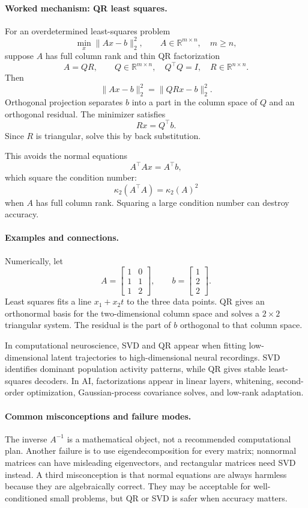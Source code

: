 \paragraph{Worked mechanism: QR least squares.}
For an overdetermined least-squares problem
\[
\min_x \|Ax-b\|_2^2,\qquad A\in\mathbb{R}^{m\times n},\quad m\geq n,
\]
suppose \(A\) has full column rank and thin QR factorization
\[
A=QR,
\qquad
Q\in\mathbb{R}^{m\times n},\quad Q^\top Q=I,\quad R\in\mathbb{R}^{n\times n}.
\]
Then
\[
\|Ax-b\|_2^2=\|QRx-b\|_2^2.
\]
Orthogonal projection separates \(b\) into a part in the column space of \(Q\) and an orthogonal residual. The minimizer satisfies
\[
Rx=Q^\top b.
\]
Since \(R\) is triangular, solve this by back substitution.

This avoids the normal equations
\[
A^\top A x=A^\top b,
\]
which square the condition number:
\[
\kappa_2(A^\top A)=\kappa_2(A)^2
\]
when \(A\) has full column rank. Squaring a large condition number can destroy accuracy.

\paragraph{Examples and connections.}
Numerically, let
\[
A=\begin{bmatrix}1&0\\1&1\\1&2\end{bmatrix},\qquad b=\begin{bmatrix}1\\2\\2\end{bmatrix}.
\]
Least squares fits a line \(x_1+x_2 t\) to the three data points. QR gives an orthonormal basis for the two-dimensional column space and solves a \(2\times 2\) triangular system. The residual is the part of \(b\) orthogonal to that column space.

In computational neuroscience, SVD and QR appear when fitting low-dimensional latent trajectories to high-dimensional neural recordings. SVD identifies dominant population activity patterns, while QR gives stable least-squares decoders. In AI, factorizations appear in linear layers, whitening, second-order optimization, Gaussian-process covariance solves, and low-rank adaptation.

\paragraph{Common misconceptions and failure modes.}
The inverse \(A^{-1}\) is a mathematical object, not a recommended computational plan. Another failure is to use eigendecomposition for every matrix; nonnormal matrices can have misleading eigenvectors, and rectangular matrices need SVD instead. A third misconception is that normal equations are always harmless because they are algebraically correct. They may be acceptable for well-conditioned small problems, but QR or SVD is safer when accuracy matters.

